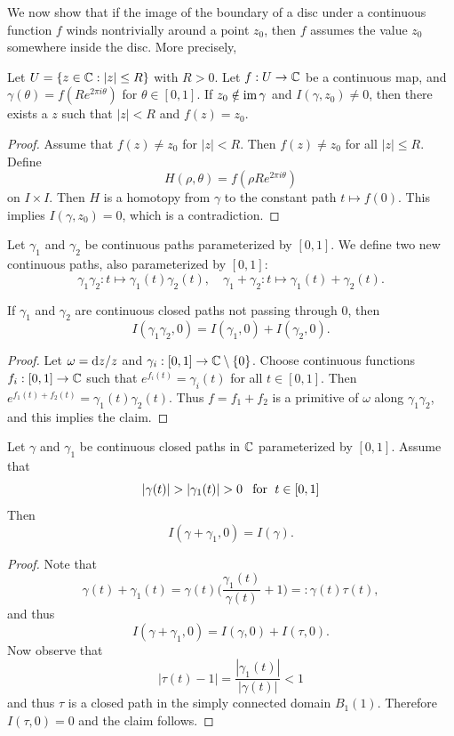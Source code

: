 We now show that if the image of the boundary of a disc under a continuous function $f$ winds nontrivially around a point $z_0$, then $f$ assumes the value $z_0$ somewhere inside the disc. More precisely,
\begin{theorem}
Let $U=\{z\in\mathbb{C}:|z|\leq R\}$ with $R>0$. Let $f:U\to\mathbb{C}$ be a continuous map, and $\gamma(\theta)=f(Re^{2\pi i\theta})$ for $\theta\in[0,1]$. If $z_0\notin\mathrm{im}\,\gamma$ and $I(\gamma,z_0)\neq 0$, then there exists a $z$ such that $|z|<R$ and $f(z)=z_0$.
\end{theorem}
\begin{proof}
Assume that $f(z)\neq z_0$ for $|z|<R$. Then $f(z)\neq z_0$ for all $|z|\leq R$. Define
\[H(\rho,\theta)=f(\rho Re^{2\pi i\theta})\]
on $I\times I$. Then $H$ is a homotopy from $\gamma$ to the constant path $t\mapsto f(0)$. This implies $I(\gamma,z_0)=0$, which is a contradiction.
\end{proof}
\begin{definition}
Let $\gamma_1$ and $\gamma_2$ be continuous paths parameterized by $[0,1]$. We define two new continuous paths, also parameterized by $[0,1]$:
\[\gamma_1\gamma_2:t\mapsto\gamma_1(t)\gamma_2(t),\quad \gamma_1+\gamma_2:t\mapsto\gamma_1(t)+\gamma_2(t).\]
\end{definition}
\begin{theorem}\label{winding number product path}
If $\gamma_1$ and $\gamma_2$ are continuous closed paths not passing through $0$, then
\[I(\gamma_1\gamma_2,0)=I(\gamma_1,0)+I(\gamma_2,0).\]
\end{theorem}
\begin{proof}
Let $\omega=\mathop{}\!\mathrm{d} z/z$ and $\gamma_i:[0,1]\to\mathbb{C}\setminus\{0\}$. Choose continuous functions $f_i:[0,1]\to\mathbb{C}$ such that $e^{f_i(t)}=\gamma_i(t)$ for all $t\in[0,1]$. Then $e^{f_1(t)+f_2(t)}=\gamma_1(t)\gamma_2(t)$. Thus $f=f_1+f_2$ is a primitive of $\omega$ along $\gamma_1\gamma_2$, and this implies the claim.
\end{proof}
\begin{theorem}\label{winding number Rouche}
Let $\gamma$ and $\gamma_1$ be continuous closed paths in $\mathbb{C}$ parameterized by $[0,1]$. Assume that
\[|\gamma(t)|>|\gamma_1(t)|>0\for t\in[0,1]\]
Then 
\[I(\gamma+\gamma_1,0)=I(\gamma).\]
\end{theorem}
\begin{proof}
Note that
\[\gamma(t)+\gamma_1(t)=\gamma(t)\Big(\frac{\gamma_1(t)}{\gamma(t)}+1\Big)=:\gamma(t)\tau(t),\]
and thus
\[I(\gamma+\gamma_1,0)=I(\gamma,0)+I(\tau,0).\]
Now observe that
\[|\tau(t)-1|=\frac{|\gamma_1(t)|}{|\gamma(t)|}<1\]
and thus $\tau$ is a closed path in the simply connected domain $B_1(1)$. Therefore $I(\tau,0)=0$ and the claim follows.
\end{proof}
